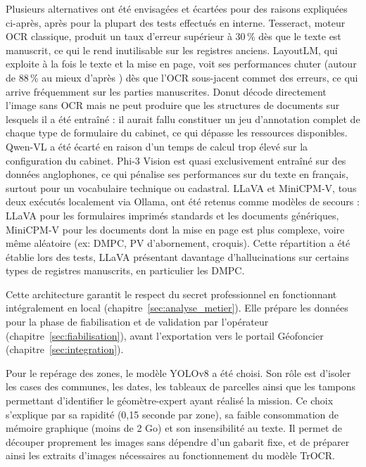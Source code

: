 Plusieurs alternatives ont été envisagées et écartées pour des raisons expliquées ci-après, après pour la plupart des tests effectués en interne. Tesseract, moteur OCR classique, produit un taux d'erreur supérieur à 30\,\% dès que le texte est manuscrit, ce qui le rend inutilisable sur les registres anciens. LayoutLM, qui exploite à la fois le texte et la mise en page, voit ses performances chuter (autour de 88\,\% au mieux d'après \citealt{bajrami_comprehensive_2023}) dès que l'OCR sous-jacent commet des erreurs, ce qui arrive fréquemment sur les parties manuscrites. Donut décode directement l'image sans OCR mais ne peut produire que les structures de documents sur lesquels il a été entraîné : il aurait fallu constituer un jeu d'annotation complet de chaque type de formulaire du cabinet, ce qui dépasse les ressources disponibles. Qwen-VL a été écarté en raison d'un temps de calcul trop élevé sur la configuration du cabinet. Phi-3 Vision est quasi exclusivement entraîné sur des données anglophones, ce qui pénalise ses performances sur du texte en français, surtout pour un vocabulaire technique ou cadastral. LLaVA et MiniCPM-V, tous deux exécutés localement via Ollama, ont été retenus comme modèles de secours : LLaVA pour les formulaires imprimés standards et les documents génériques, MiniCPM-V pour les documents dont la mise en page est plus complexe, voire même aléatoire (ex: DMPC, PV d'abornement, croquis). Cette répartition a été établie lors des tests, LLaVA présentant davantage d'hallucinations sur certains types de registres manuscrits, en particulier les DMPC.

Cette architecture garantit le respect du secret professionnel en fonctionnant intégralement en local (chapitre~\ref{sec:analyse_metier}). Elle prépare les données pour la phase de fiabilisation et de validation par l'opérateur (chapitre~\ref{sec:fiabilisation}), avant l'exportation vers le portail Géofoncier (chapitre~\ref{sec:integration}).


Pour le repérage des zones, le modèle YOLOv8 a été choisi. Son rôle est d'isoler les cases des communes, les dates, les tableaux de parcelles ainsi que les tampons permettant d'identifier le géomètre-expert ayant réalisé la mission. Ce choix s'explique par sa rapidité (0,15 seconde par zone), sa faible consommation de mémoire graphique (moins de 2 Go) et son insensibilité au texte. Il permet de découper proprement les images sans dépendre d'un gabarit fixe, et de préparer ainsi les extraits d'images nécessaires au fonctionnement du modèle TrOCR.


